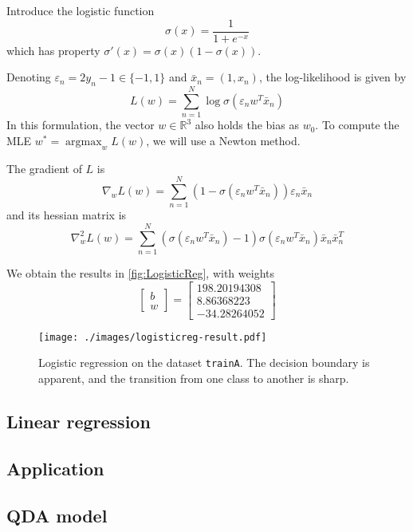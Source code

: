 \documentclass[11pt]{article}
\newcommand\RR{\mathbb{R}}
\renewcommand{\epsilon}{\varepsilon}
\DeclareMathOperator*{\argmax}{\mathrm{argmax}}
\begin{document}
Introduce the logistic function
\[
	\sigma(x) = \frac{1}{1 + e^{-x}}
\]
which has property $\sigma'(x) = \sigma(x)(1-\sigma(x))$.

Denoting $\epsilon_n = 2y_n - 1 \in \{-1,1\}$ and $\bar{x}_n = (1, x_n)$, the log-likelihood is given by
\begin{equation}
L(w) = \sum_{n=1}^N \log\sigma(\epsilon_n w^T\bar{x}_n)
\end{equation}
In this formulation, the vector $w\in\RR^3$ also holds the bias as $w_0$. To compute the MLE $w^* = \argmax_{w} L(w)$, we will use a Newton method.

The gradient of $L$ is
\begin{equation}
\nabla_w L(w) =
\sum_{n=1}^N \left(1 - \sigma(\epsilon_n w^T\bar{x}_n)\right) \epsilon_n \bar{x}_n
\end{equation}
and its hessian matrix is
\begin{equation}
\nabla_w^2 L(w) =
\sum_{n=1}^N (\sigma(\epsilon_nw^T\bar{x}_n)-1)\sigma(\epsilon_nw^T\bar{x}_n) \bar{x}_n \bar{x}_n^T
\end{equation}

We obtain the results in \autoref{fig:LogisticReg}, with weights
\[
	\begin{bmatrix}
	b \\ w
	\end{bmatrix} =
	\begin{bmatrix}
	198.20194308 \\ 8.86368223\\ -34.28264052
	\end{bmatrix}
\]


\begin{figure}
	\centering
	\texttt{[image: ./images/logisticreg-result.pdf]}
	\caption{Logistic regression on the dataset \texttt{trainA}. The decision boundary is apparent, and the transition from one class to another is sharp.}\label{fig:LogisticReg}
\end{figure}


\subsection{Linear regression}










\subsection{Application}



\subsection{QDA model}
\end{document}
